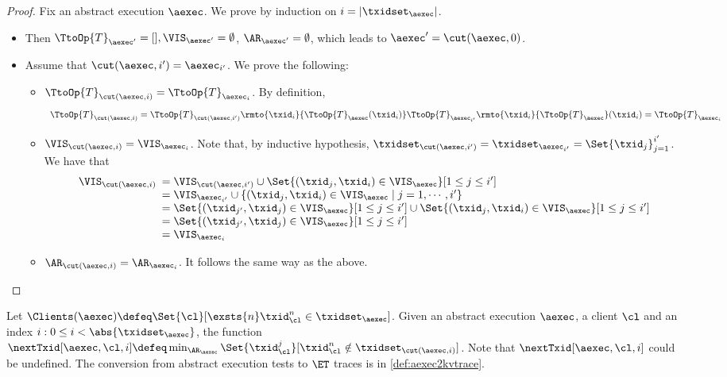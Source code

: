 \begin{proof}
Fix an abstract execution $\aexec$. We prove by induction on $i = \lvert \txidset_{\aexec} \rvert$.
\begin{itemize}
\item {} Then $\TtoOp{T}_{\aexec'} = [], \VIS_{\aexec'} = \emptyset$, 
$\AR_{\aexec'} = \emptyset$, which leads to $\aexec' = \cut(\aexec, 0)$. 
\item {} 
Assume that $\cut(\aexec, i') = \aexec_{i'}$. 
We prove the following: 
\begin{itemize}
\item $\TtoOp{T}_{\cut(\aexec, i)} = \TtoOp{T}_{\aexec_i}$. 
By definition, 
\[
    \begin{array}{l}
\TtoOp{T}_{\cut(\aexec,i)} = \TtoOp{T}_{\cut(\aexec, i')}\rmto{\txid_{i}}{\TtoOp{T}_{\aexec}(\txid_{i})} 
\TtoOp{T}_{\aexec_{i'}}\rmto{\txid_{i}}{\TtoOp{T}_{\aexec}}(\txid_{i}) = \TtoOp{T}_{\aexec_{i}}
\end{array}
\]
\item $\VIS_{\cut(\aexec, i)} = \VIS_{\aexec_{i}}$. 
Note that, by inductive hypothesis, $\txidset_{\cut(\aexec, i')} = \txidset_{\aexec_{i'}} = \Set{\txid_{j}}_{j=1}^{i'}$. 
We have that  
\[
\begin{array}{l}
    \VIS_{\cut(\aexec, i)}
    \begin{array}[t]{l}
    = \VIS_{\cut(\aexec, i')} \cup \Set{(\txid_j, \txid_{i}) \in \VIS_{\aexec}}[1 \leq j \leq i'] \\ 
    = \VIS_{\aexec_{i'}} \cup \{(\txid_{j}, \txid_{i}) \in \VIS_{\aexec} \mid j=1,\cdots, i'\} \\ 
    = \Set{(\txid_{j'}, \txid_{j}) \in \VIS_{\aexec}}[1 \leq j \leq i'] \cup \Set{(\txid_{j}, \txid_{i}) \in \VIS_{\aexec}}[1 \leq j \leq i'] \\
    = \Set{(\txid_{j'}, \txid_{j}) \in \VIS_{\aexec}}[1 \leq j \leq i'] \\
    = \VIS_{\aexec_{i}}
    \end{array}
\end{array}
\]
\item $\AR_{\cut(\aexec, i)} = \AR_{\aexec_{i}}$. It follows the same way 
as the above. 
\end{itemize}
\end{itemize}
\end{proof}

Let $\Clients(\aexec) \defeq \Set{\cl}[\exsts{ n } \txid_{\cl}^{n} \in \txidset_{\aexec}]$.
Given an abstract execution $\aexec$, a client $\cl$ and an index $i : 0 \leq i < \abs{\txidset_\aexec}$,
the function $\nextTxid[\aexec, \cl, i] \defeq \min_{\AR_{\aexec}} \Set{\txid_{\cl}^{j} }[ \txid_{\cl}^{n} \notin \txidset_{\cut(\aexec, i)}]$. 
Note that $\nextTxid[\aexec, \cl, i]$ could be undefined. 
The conversion from abstract execution tests to \( \ET \) traces is in \cref{def:aexec2kvtrace}.

